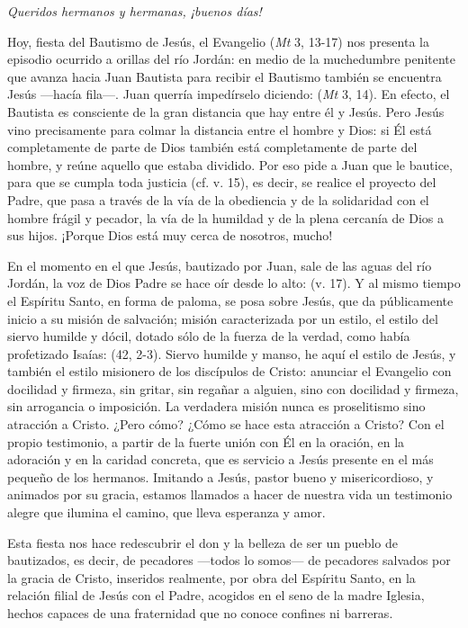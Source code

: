 \emph{Queridos hermanos y hermanas, ¡buenos días!}

Hoy, fiesta del Bautismo de Jesús, el Evangelio (\emph{Mt} 3, 13-17) nos presenta la episodio ocurrido a orillas del río Jordán: en medio de la muchedumbre penitente que avanza hacia Juan Bautista para recibir el Bautismo también se encuentra Jesús ---hacía fila---. Juan querría impedírselo diciendo:  (\emph{Mt} 3, 14). En efecto, el Bautista es consciente de la gran distancia que hay entre él y Jesús. Pero Jesús vino precisamente para colmar la distancia entre el hombre y Dios: si Él está completamente de parte de Dios también está completamente de parte del hombre, y reúne aquello que estaba dividido. Por eso pide a Juan que le bautice, para que se cumpla toda justicia (cf. v. 15), es decir, se realice el proyecto del Padre, que pasa a través de la vía de la obediencia y de la solidaridad con el hombre frágil y pecador, la vía de la humildad y de la plena cercanía de Dios a sus hijos. ¡Porque Dios está muy cerca de nosotros, mucho!

En el momento en el que Jesús, bautizado por Juan, sale de las aguas del río Jordán, la voz de Dios Padre se hace oír desde lo alto:  (v. 17). Y al mismo tiempo el Espíritu Santo, en forma de paloma, se posa sobre Jesús, que da públicamente inicio a su misión de salvación; misión caracterizada por un estilo, el estilo del siervo humilde y dócil, dotado sólo de la fuerza de la verdad, como había profetizado Isaías:  (42, 2-3). Siervo humilde y manso, he aquí el estilo de Jesús, y también el estilo misionero de los discípulos de Cristo: anunciar el Evangelio con docilidad y firmeza, sin gritar, sin regañar a alguien, sino con docilidad y firmeza, sin arrogancia o imposición. La verdadera misión nunca es proselitismo sino atracción a Cristo. ¿Pero cómo? ¿Cómo se hace esta atracción a Cristo? Con el propio testimonio, a partir de la fuerte unión con Él en la oración, en la adoración y en la caridad concreta, que es servicio a Jesús presente en el más pequeño de los hermanos. Imitando a Jesús, pastor bueno y misericordioso, y animados por su gracia, estamos llamados a hacer de nuestra vida un testimonio alegre que ilumina el camino, que lleva esperanza y amor.

Esta fiesta nos hace redescubrir el don y la belleza de ser un pueblo de bautizados, es decir, de pecadores ---todos lo somos--- de pecadores salvados por la gracia de Cristo, inseridos realmente, por obra del Espíritu Santo, en la relación filial de Jesús con el Padre, acogidos en el seno de la madre Iglesia, hechos capaces de una fraternidad que no conoce confines ni barreras.

